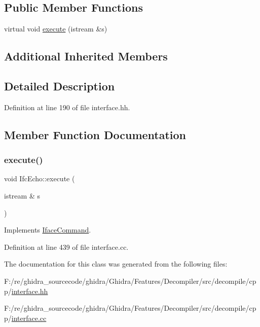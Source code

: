 \subsection*{Public Member Functions}
\begin{DoxyCompactItemize}
\item 
virtual void \mbox{\hyperlink{class_ifc_echo_a37fd2ae3be2b866127abccc2989961a9}{execute}} (istream \&s)
\end{DoxyCompactItemize}
\subsection*{Additional Inherited Members}


\subsection{Detailed Description}


Definition at line 190 of file interface.\+hh.



\subsection{Member Function Documentation}
\mbox{\label{class_ifc_echo_a37fd2ae3be2b866127abccc2989961a9}} 
\subsubsection{\texorpdfstring{execute()}{execute()}}
{\footnotesize\ttfamily void Ifc\+Echo\+::execute (\begin{DoxyParamCaption}\item[{istream \&}]{s }\end{DoxyParamCaption})\hspace{0.3cm}{\ttfamily [virtual]}}



Implements \mbox{\hyperlink{class_iface_command_af10e29cee2c8e419de6efe9e680ad201}{Iface\+Command}}.



Definition at line 439 of file interface.\+cc.



The documentation for this class was generated from the following files\+:\begin{DoxyCompactItemize}
\item 
F\+:/re/ghidra\+\_\+sourcecode/ghidra/\+Ghidra/\+Features/\+Decompiler/src/decompile/cpp/\mbox{\hyperlink{interface_8hh}{interface.\+hh}}\item 
F\+:/re/ghidra\+\_\+sourcecode/ghidra/\+Ghidra/\+Features/\+Decompiler/src/decompile/cpp/\mbox{\hyperlink{interface_8cc}{interface.\+cc}}\end{DoxyCompactItemize}
